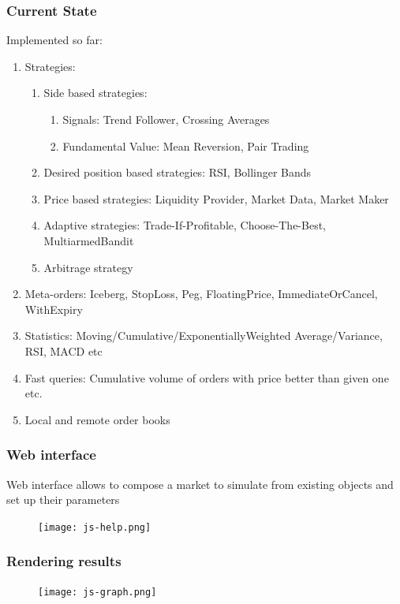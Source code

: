 \documentclass{beamer}
\begin{document}
\begin{frame}
\frametitle{Current State}
Implemented so far:
\begin{enumerate}
  \item Strategies: 
  \begin{enumerate}
    \item Side based strategies:
    \begin{enumerate}
        \item Signals: Trend Follower, Crossing Averages
        \item Fundamental Value: Mean Reversion, Pair Trading
    \end{enumerate}    
    \item Desired position based strategies: RSI, Bollinger Bands
    \item Price based strategies: Liquidity Provider, Market Data, Market Maker
    \item Adaptive strategies: Trade-If-Profitable, Choose-The-Best, MultiarmedBandit
    \item Arbitrage strategy
  \end{enumerate}
  \item Meta-orders: Iceberg, StopLoss, Peg, FloatingPrice, ImmediateOrCancel, WithExpiry
  \item Statistics: Moving/Cumulative/ExponentiallyWeighted Average/Variance, RSI, MACD etc
  \item Fast queries: Cumulative volume of orders with price better than given one etc.
  \item Local and remote order books
\end{enumerate}
\end{frame}
\begin{frame}
\frametitle{Web interface}
Web interface allows to compose a market to simulate from existing objects and set up their parameters
\begin{figure}[htbp]
\centering
\texttt{[image: js-help.png]}
\end{figure}
\end{frame}

\begin{frame}
\frametitle{Rendering results}
\begin{figure}[htbp]
\centering
\texttt{[image: js-graph.png]}
\end{figure}
\end{frame}
\end{document}

